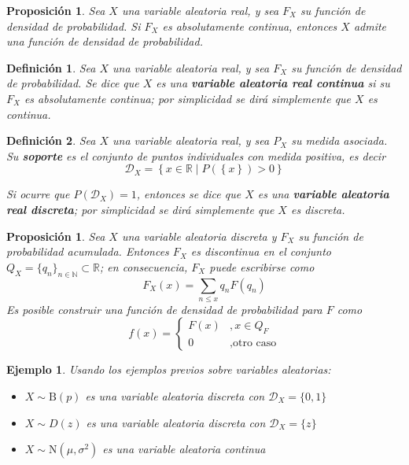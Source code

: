 \documentclass[12pt,letterpaper]{book}
\newtheorem{definicion}{Definición}[chapter]
\newtheorem{proposicion}[teorema]{Proposición}
\newtheorem{ejemplo}{Ejemplo}[chapter]
\newcommand{\R}{\mathbb{R}}
\newcommand{\N}{\mathbb{N}}
\newcommand{\talque}{\mathrel{}\middle|\mathrel{}}
\begin{document}
\begin{proposicion}
Sea $X$ una variable aleatoria real, y sea $F_X$ su función de densidad de probabilidad.
%
Si $F_X$ es absolutamente continua, entonces $X$ admite una función de densidad de probabilidad.
\end{proposicion}

\begin{definicion}
Sea $X$ una variable aleatoria real, y sea $F_X$ su función de densidad de probabilidad.
%
Se dice que $X$ es una \textbf{variable aleatoria real continua} si su $F_X$ es absolutamente continua; por simplicidad se dirá simplemente que $X$ es continua.
\end{definicion}

\begin{definicion}
Sea $X$ una variable aleatoria real, y sea $P_X$ su medida asociada.
%
Su \textbf{soporte} es el conjunto de puntos individuales con medida positiva, es decir
\begin{equation}
\mathcal{D}_X = \left\{ x\in \R \talque P\left( \left\{ x\right\} \right)>0 \right\}
\end{equation}

Si ocurre que $P(\mathcal{D}_X) = 1$, entonces se dice que $X$ es una \textbf{variable aleatoria real discreta}; por simplicidad se dirá simplemente que $X$ es discreta.
\end{definicion}

\begin{proposicion}
Sea $X$ una variable aleatoria discreta y $F_X$ su función de probabilidad acumulada.
%
Entonces $F_X$ es discontinua en el conjunto $Q_X=\{q_n\}_{n\in \N} \subset \R$; en consecuencia, $F_X$ puede escribirse como 
\begin{equation}
F_X(x) = \sum_{n\leq x} q_n F({q_n})
\end{equation}
Es posible construir una función de densidad de probabilidad para $F$ como
\begin{equation}
f(x) = \begin{cases}
F({x}) &, x\in Q_F \\
0 &, \text{otro caso}
\end{cases}
\end{equation}
\end{proposicion}

\begin{ejemplo}
Usando los ejemplos previos sobre variables aleatorias:
\begin{itemize}
\item $X\sim \text{B}(p)$ es una variable aleatoria discreta con $\mathcal{D}_X = \{0,1\}$
\item $X\sim D(z)$ es una variable aleatoria discreta con $\mathcal{D}_X = \{z\}$
\item $X\sim \text{N}(\mu,\sigma^{2})$ es una variable aleatoria continua
\end{itemize}
\end{ejemplo}
\end{document}
